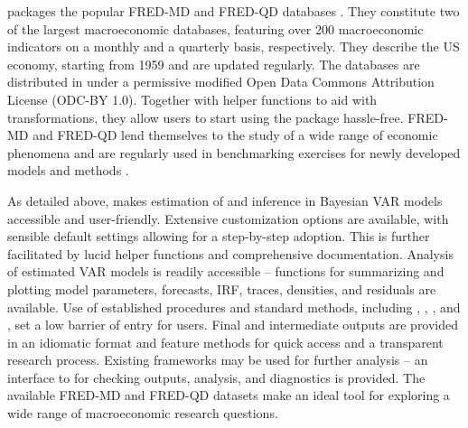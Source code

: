 \documentclass[article,nojss]{jss} %
\begin{document}
 packages the popular FRED-MD and FRED-QD databases \citep{mccracken2016}. They constitute two of the largest macroeconomic databases, featuring over 200 macroeconomic indicators on a monthly and a quarterly basis, respectively. They describe the US economy, starting from 1959 and are updated regularly.
The databases are distributed in  under a permissive modified Open Data Commons Attribution License (ODC-BY 1.0).
Together with helper functions to aid with transformations, they allow users to start using the package hassle-free. FRED-MD and FRED-QD lend themselves to the study of a wide range of economic phenomena and are regularly used in benchmarking exercises for newly developed models and methods \citep[see inter alia][]{carriero2018, koop2019, huber2020}.

As detailed above,  makes estimation of and inference in Bayesian VAR models accessible and user-friendly.
Extensive customization options are available, with sensible default settings allowing for a step-by-step adoption. This is further facilitated by lucid helper functions and comprehensive documentation.
Analysis of estimated VAR models is readily accessible -- functions for summarizing and plotting model parameters, forecasts, IRF, traces, densities, and residuals are available. Use of established procedures and standard methods, including , , , and , set a low barrier of entry for  users.
Final and intermediate outputs are provided in an idiomatic format and feature  methods for quick access and a transparent research process.
Existing frameworks may be used for further analysis -- an interface to  for checking outputs, analysis, and diagnostics is provided.
The available FRED-MD and FRED-QD datasets make  an ideal tool for exploring a wide range of macroeconomic research questions.



\end{document}
